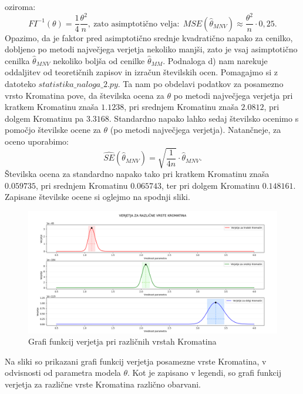 \documentclass{article}
\begin{document}
oziroma: 
$$ 
    FI^{-1}(\theta) = \frac{1}{4}\frac{\theta^2}{n},~\text{zato asimptotično velja:}~~MSE(\hat{\theta}_{MNV}) \approx \frac{\theta^2}{n} \cdot 0{,}25. 
$$
Opazimo, da je faktor pred asimptotično srednje kvadratično napako za cenilko, dobljeno po metodi največjega verjetja nekoliko manjši, zato je vsaj asimptotično cenilka $\hat{\theta}_{MNV}$ nekoliko boljša od cenilke $\hat{\theta}_{MM}$.
\newline
\newline
Podnaloga d) nam narekuje oddaljitev od teoretičnih zapisov in izračun številskih ocen. Pomagajmo si z datoteko $statistika\_naloga\_2.py$. 
Ta nam po obdelavi podatkov za posamezno vrsto Kromatina pove, da številska ocena za $\theta$ po metodi največjega verjetja pri kratkem Kromatinu znaša $1.1238$, pri srednjem Kromatinu znaša $2.0812$, pri dolgem Kromatinu pa $3.3168$.
Standardno napako lahko sedaj številsko ocenimo s pomočjo številske ocene za $\theta$ (po metodi največjega verjetja). Natančneje, za oceno uporabimo:
$$
    \widehat{SE}(\hat{\theta}_{MNV}) = \sqrt{\frac{1}{4n}} \cdot\hat{\theta}_{MNV}.
$$
Številska ocena za standardno napako tako pri kratkem Kromatinu znaša $0.059735$, pri srednjem Kromatinu $0.065743$, ter pri dolgem Kromatinu $0.148161$.
Zapisane številske ocene si oglejmo na spodnji sliki. 
\begin{figure}[H]
    \begin{center}
    \includegraphics[width=\linewidth]{naloga2d.png}
    \vspace*{-5mm}\caption{Grafi funkcij verjetja pri različnih vrstah Kromatina}
    \end{center}    
\end{figure}
Na sliki so prikazani grafi funkcij verjetja posamezne vrste Kromatina, v odvisnosti od parametra modela $\theta$. Kot je zapisano v legendi, so grafi funkcij verjetja za različne vrste Kromatina različno obarvani. 
\end{document}
